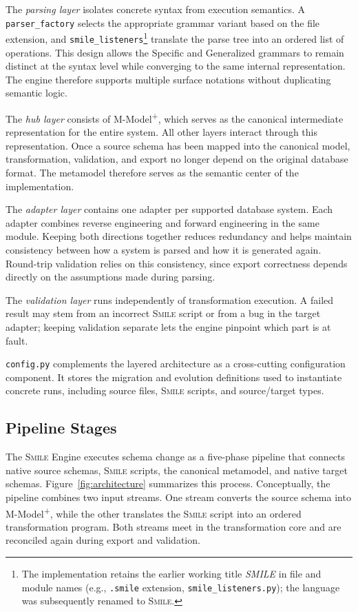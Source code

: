 \documentclass{llncs}
\begin{document}
The \emph{parsing layer} isolates concrete syntax from execution semantics.
A \texttt{parser\_factory} selects the appropriate grammar variant based on the file extension, and \texttt{smile\_listeners}\footnote{The implementation retains the earlier working title \emph{SMILE} in file and module names (e.g., \texttt{.smile} extension, \texttt{smile\_listeners.py}); the language was subsequently renamed to \textsc{Smile}.} translate the parse tree into an ordered list of operations.
This design allows the Specific and Generalized grammars to remain distinct at the syntax level while converging to the same internal representation.
The engine therefore supports multiple surface notations without duplicating semantic logic.

The \emph{hub layer} consists of M-Model\textsuperscript{+}, which serves as the canonical intermediate representation for the entire system.
All other layers interact through this representation.
Once a source schema has been mapped into the canonical model, transformation, validation, and export no longer depend on the original database format.
The metamodel therefore serves as the semantic center of the implementation.

The \emph{adapter layer} contains one adapter per supported database system.
Each adapter combines reverse engineering and forward engineering in the same module.
Keeping both directions together reduces redundancy and helps maintain consistency between how a system is parsed and how it is generated again.
Round-trip validation relies on this consistency, since export correctness depends directly on the assumptions made during parsing.

The \emph{validation layer} runs independently of transformation execution.
A failed result may stem from an incorrect \textsc{Smile} script or from a bug in the target adapter; keeping validation separate lets the engine pinpoint which part is at fault.

\texttt{config.py} complements the layered architecture as a cross-cutting configuration component.
It stores the migration and evolution definitions used to instantiate concrete runs, including source files, \textsc{Smile} scripts, and source/target types.

\subsection{Pipeline Stages}
\label{sec:pipeline-stages}

The \textsc{Smile} Engine executes schema change as a five-phase pipeline that connects native source schemas, \textsc{Smile} scripts, the canonical metamodel, and native target schemas.
Figure~\ref{fig:architecture} summarizes this process.
Conceptually, the pipeline combines two input streams.
One stream converts the source schema into M-Model\textsuperscript{+}, while the other translates the \textsc{Smile} script into an ordered transformation program.
Both streams meet in the transformation core and are reconciled again during export and validation.
\end{document}
